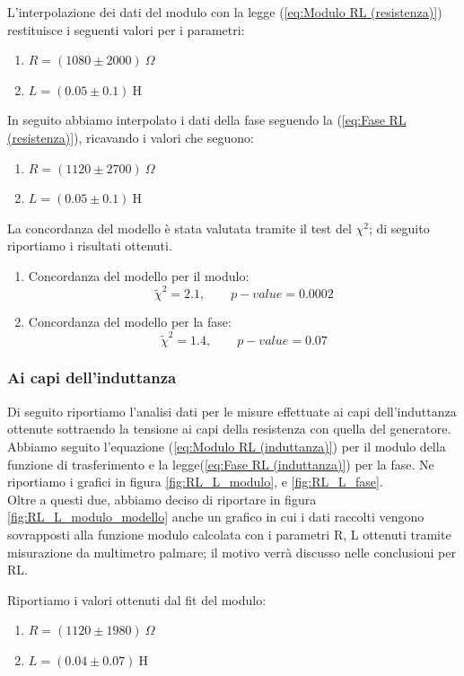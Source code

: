 \documentclass[letterpaper,12pt]{article}
\begin{document}
L'interpolazione dei dati del modulo con la legge (\ref{eq:Modulo RL (resistenza)}) restituisce i seguenti valori per i parametri:
\begin{enumerate} 
    \item $R = (1080 \pm 2000)\ \Omega $
    \item $L = (0.05 \pm 0.1)\ \text{H} $
\end{enumerate}
In seguito abbiamo interpolato i dati della fase seguendo la (\ref{eq:Fase RL (resistenza)}), ricavando i valori che seguono:
\begin{enumerate} %
    \item $ R = (1120 \pm 2700)\ \Omega$
    \item $ L = (0.05 \pm 0.1)\ \text{H}$
\end{enumerate}
La concordanza del modello è stata valutata tramite il test del $\chi^2$; di seguito riportiamo i risultati ottenuti.
\begin{enumerate}
    \item Concordanza del modello per il modulo:
$$ \widetilde{\chi}^2 = 2.1, \qquad p-value = 0.0002 $$
    \item Concordanza del modello per la fase:
$$ \widetilde{\chi}^2 = 1.4, \qquad p-value = 0.07$$
\end{enumerate}

\subsubsection{Ai capi dell'induttanza}
Di seguito riportiamo l'analisi dati per le misure effettuate ai capi dell'induttanza
 ottenute sottraendo la tensione ai capi della resistenza con quella del generatore. Abbiamo seguito l'equazione (\ref{eq:Modulo RL (induttanza)}) per il modulo della funzione di trasferimento e la legge(\ref{eq:Fase RL (induttanza)}) per la fase. Ne riportiamo i grafici in figura \ref{fig:RL_L_modulo}, e \ref{fig:RL_L_fase}.\\
Oltre a questi due, abbiamo deciso di riportare in figura \ref{fig:RL_L_modulo_modello} anche un grafico in cui i dati raccolti vengono sovrapposti alla funzione modulo calcolata con i parametri R, L ottenuti tramite misurazione da multimetro palmare; il motivo verrà discusso nelle conclusioni per RL.

Riportiamo i valori ottenuti dal fit del modulo:
\begin{enumerate} 
    \item $R = (1120\pm 1980)\ \Omega $
    \item $L = (0.04 \pm 0.07)\ \text{H}$
\end{enumerate}
\end{document}
